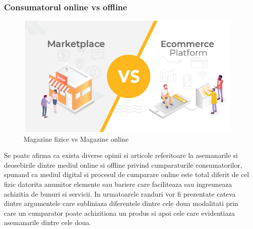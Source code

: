 \documentclass[a4paper, 12pt]{article}
\begin{document}
			\subsubsection{Consumatorul online vs offline}
				\begin{figure}[!htb]
				\centering
				\includegraphics[width=13cm, height=6cm]{"figures/magazin.png"}
				\caption{Magazine fizice vs Magazine online}
			\end{figure}
			
			
			\quad Se poate afirma ca exista diverse opinii si articole referitoare la asemanarile si deosebirile dintre mediul online si offline privind cumparaturile consumatorilor, spunand ca mediul digital si procesul de cumparare online este total diferit de cel fizic datorita anumitor elemente sau bariere care faciliteaza sau ingreuneaza achizitia de bunuri si servicii. In urmatoarele randuri vor fi prezentate cateva dintre argumentele care subliniaza diferentele dintre cele doua modalitati prin care un cumparator poate achizitiona un produs si apoi cele care evidentiaza asemanarile dintre cele doua.
		\bigskip
			
\end{document}
